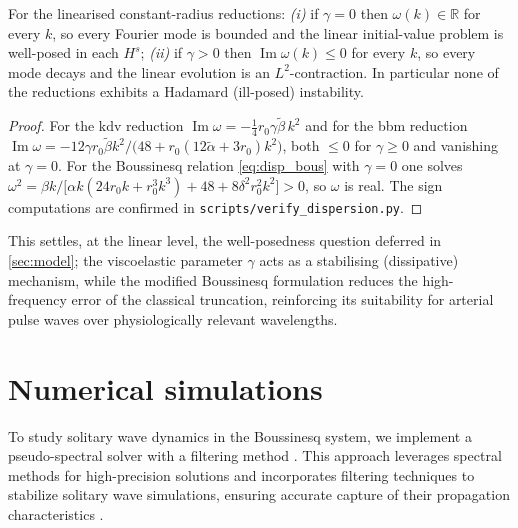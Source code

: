 \documentclass[alpha-refs, 12pt]{wiley-article}
\begin{document}
\begin{proposition}\label{prop:linWP}
For the linearised constant-radius reductions: \emph{(i)} if $\gamma=0$ then $\omega(k)\in\mathbb{R}$ for every $k$, so every Fourier mode is bounded and the linear initial-value problem is well-posed in each $H^{s}$; \emph{(ii)} if $\gamma>0$ then $\operatorname{Im}\omega(k)\le0$ for every $k$, so every mode decays and the linear evolution is an $L^{2}$-contraction. In particular none of the reductions exhibits a Hadamard (ill-posed) instability.
\end{proposition}
\begin{proof}
For the \acrshort{kdv} reduction $\operatorname{Im}\omega=-\tfrac14 r_{0}\gamma\tilde{\beta}\,k^{2}$ and for the \acrshort{bbm} reduction $\operatorname{Im}\omega=-12\gamma r_{0}\tilde{\beta}k^{2}/\bigl(48+r_{0}(12\tilde{\alpha}+3r_{0})k^{2}\bigr)$, both $\le0$ for $\gamma\ge0$ and vanishing at $\gamma=0$. For the Boussinesq relation \eqref{eq:disp_bous} with $\gamma=0$ one solves $\omega^{2}=\beta k/\bigl[\alpha k(24r_{0}k+r_{0}^{3}k^{3})+48+8\delta^{2}r_{0}^{2}k^{2}\bigr]>0$, so $\omega$ is real. The sign computations are confirmed in \texttt{scripts/verify\_dispersion.py}.
\end{proof}

This settles, at the linear level, the well-posedness question deferred in \cref{sec:model}; the viscoelastic parameter $\gamma$ acts as a stabilising (dissipative) mechanism, while the modified Boussinesq formulation reduces the high-frequency error of the classical truncation, reinforcing its suitability for arterial pulse waves over physiologically relevant wavelengths.

\section{Numerical simulations}\label{sec:numerics}

To study solitary wave dynamics in the Boussinesq system, we implement a pseudo-spectral solver with a filtering method \citep{BonaCh}. This approach leverages spectral methods for high-precision solutions and incorporates filtering techniques to stabilize solitary wave simulations, ensuring accurate capture of their propagation characteristics \citep{Trefethen2000, Boyd2000}.
\end{document}
